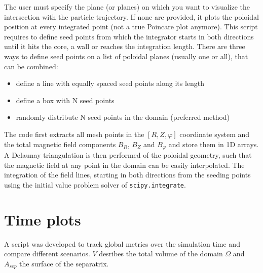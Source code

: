 The user must specify the plane (or planes) on which you want to visualize the intersection with the particle trajectory. If none are provided, it plots the poloidal position at every integrated point (not a true Poincare plot anymore). This script requires to define seed points from which the integrator starts in  both directions until it hits the core, a wall or reaches the integration length. There are three ways to define seed points on a list of poloidal planes (usually one or all), that can be combined:
\begin{itemize}
  	\item define a line with equally spaced seed points along its length
	\item define a box with N seed points
	\item randomly distribute N seed points in the domain (preferred method) 
\end{itemize}

The code first extracts all mesh points in the $[R,Z,\varphi]$ coordinate system and the total magnetic field components $B_R$, $B_Z$ and $B_\varphi$ and store them in 1D arrays. A Delaunay triangulation is then performed of the poloidal geometry, such that the magnetic field at any point in the domain can be easily interpolated. The integration of the field lines, starting in both directions from the seeding points using the initial value problem solver of \texttt{scipy.integrate}.
 


\section{Time plots}
\label{sec:app_timePlots}
A script was developed to track global metrics over the simulation time and compare different scenarios. $V$ desribes the total volume of the domain $\Omega$ and $A_{sep}$ the surface of the separatrix.

